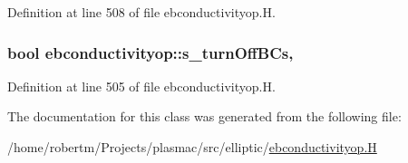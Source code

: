 Definition at line 508 of file ebconductivityop.\+H.

\subsubsection[{\texorpdfstring{s\+\_\+turn\+Off\+B\+Cs}{s_turnOffBCs}}]{\setlength{\rightskip}{0pt plus 5cm}bool ebconductivityop\+::s\+\_\+turn\+Off\+B\+Cs\hspace{0.3cm}{\ttfamily [static]}, {\ttfamily [protected]}}\hypertarget{classebconductivityop_abcd7d0aa025a488ff45ee53c9fa8627a}{}\label{classebconductivityop_abcd7d0aa025a488ff45ee53c9fa8627a}


Definition at line 505 of file ebconductivityop.\+H.



The documentation for this class was generated from the following file\+:\begin{DoxyCompactItemize}
\item 
/home/robertm/\+Projects/plasmac/src/elliptic/\hyperlink{ebconductivityop_8H}{ebconductivityop.\+H}\end{DoxyCompactItemize}
